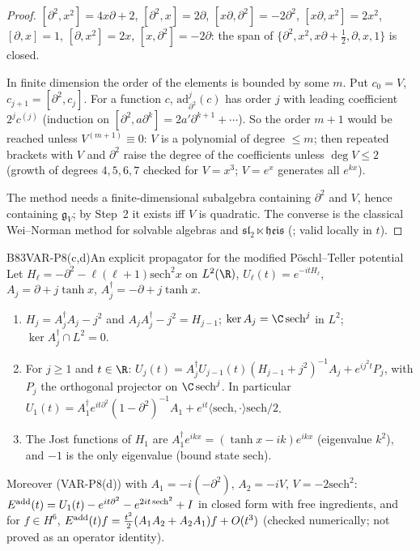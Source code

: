 \begin{proof}
$[\partial^2,x^2]=4x\partial+2$, $[\partial^2,x]=2\partial$, $[x\partial,\partial^2]=-2\partial^2$, $[x\partial,x^2]=2x^2$, $[\partial,x]=1$, $[\partial,x^2]=2x$, $[x,\partial^2]=-2\partial$: the span of $\{\partial^2,x^2,x\partial+\tfrac12,\partial,x,1\}$ is closed.

In finite dimension the order of the elements is bounded by some $m$. Put $c_0=V$, $c_{j+1}=[\partial^2,c_j]$. For a function $c$, $\mathrm{ad}^j_{\partial^2}(c)$ has order $j$ with leading coefficient $2^jc^{(j)}$ (induction on $[\partial^2,a\partial^k]=2a'\partial^{k+1}+\cdots$). So the order $m+1$ would be reached unless $V^{(m+1)}\equiv0$: $V$ is a polynomial of degree $\le m$; then repeated brackets with $V$ and $\partial^2$ raise the degree of the coefficients unless $\deg V\le2$ (growth of degrees $4,5,6,7$ checked for $V=x^3$; $V=e^x$ generates all $e^{kx}$).

The method needs a finite-dimensional subalgebra containing $\partial^2$ and $V$, hence containing $\mathfrak g_V$; by Step~2 it exists iff $V$ is quadratic. The converse is the classical Wei--Norman method for solvable algebras and $\mathfrak{sl}_2\ltimes\mathfrak{heis}$ (\cf; valid locally in $t$).

\end{proof}

\begin{dimcard}{B83}{VAR-P8(c,d)}{An explicit propagator for the modified P\"oschl--Teller potential}{\pw}{}
Let $H_\ell=-\partial^2-\ell(\ell+1)\mathrm{sech}^2x$ on $L^2(\R)$, $U_\ell(t)=e^{-itH_\ell}$, $A_j=\partial+j\tanh x$, $A_j^\dagger=-\partial+j\tanh x$.
\begin{enumerate}[label=(\roman*)]
\item $H_j=A_j^\dagger A_j-j^2$ and $A_jA_j^\dagger-j^2=H_{j-1}$; $\ker A_j=\C\,\mathrm{sech}^j$ in $L^2$; $\ker A_j^\dagger\cap L^2=0$.
\item For $j\ge1$ and $t\in\R$: $U_j(t)=A_j^\dagger U_{j-1}(t)(H_{j-1}+j^2)^{-1}A_j+e^{ij^2t}P_j$, with $P_j$ the orthogonal projector on $\C\,\mathrm{sech}^j$. In particular $U_1(t)=A_1^\dagger e^{it\partial^2}(1-\partial^2)^{-1}A_1+e^{it}\langle\mathrm{sech},\cdot\rangle\mathrm{sech}/2$.
\item The Jost functions of $H_1$ are $A_1^\dagger e^{ikx}=(\tanh x-ik)e^{ikx}$ (eigenvalue $k^2$), and $-1$ is the only eigenvalue (bound state $\mathrm{sech}$).
\end{enumerate}
Moreover (VAR-P8(d)) with $A_1=-i(-\partial^2)$, $A_2=-iV$, $V=-2\mathrm{sech}^2$: $E^{\rm add}(t)=U_1(t)-e^{it\partial^2}-e^{2it\,\mathrm{sech}^2}+I$ in closed form with free ingredients, and for $f\in H^6$, $E^{\rm add}(t)f=\frac{t^2}2(A_1A_2+A_2A_1)f+O(t^3)$ (checked numerically; not proved as an operator identity).
\end{dimcard}

